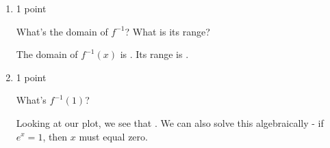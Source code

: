 \documentclass{article}
\begin{document}
\begin{enumerate}
\begin{enumerate}
    \begin{solution}
      We know that $f$ is invertible because every $y$ value has only one $x$ value associated with it - in other words, it passes the horizontal line test. In the figure below, $y=e^x$ is given in blue, $f^{-1}$ is given in red, and $y=x$ is the dashed line.
      \begin{center}
      \end{center}
    \end{solution}

  \item

    \begin{grading}
      1 point
    \end{grading}

    \begin{problem}[\stretch{0.5}]
      What's the domain of $f^{-1}$? What is its range?
    \end{problem}

    \begin{solution}
      The domain of $f^{-1}(x)$ is . Its range is \fbox{$(-\infty, \infty)$}.
    \end{solution}

  \item

    \begin{grading}
      1 point
    \end{grading}

    \begin{problem}[\stretch{0.5}]
      What's $f^{-1}(1)$?
    \end{problem}

    \begin{solution}
      Looking at our plot, we see that . We can also solve this algebraically - if $e^x=1$, then $x$ must equal zero.
    \end{solution}


\end{enumerate}
\end{enumerate}
\end{document}
